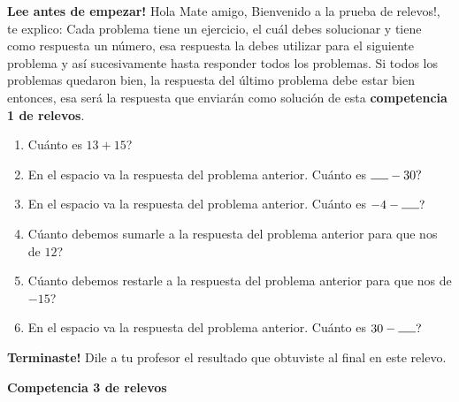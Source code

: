 \textbf{Lee antes de empezar! } Hola Mate amigo, Bienvenido a la prueba de relevos!, te explico: Cada problema tiene un ejercicio, el cuál debes solucionar y tiene como respuesta un número, esa respuesta la debes utilizar para el siguiente problema y así sucesivamente hasta responder todos los problemas. Si todos los problemas quedaron bien, la respuesta del último problema debe estar bien entonces, esa será la respuesta que enviarán como solución de esta \textbf{competencia 1 de relevos}.
\vspace{1cm}
\begin{enumerate}
	\item Cuánto es $13+15$?
	
	\item En el espacio va la respuesta del problema anterior. Cuánto es $\rule{5mm}{0.15mm} - 30?$
	
	\item En el espacio va la respuesta del problema anterior. Cuánto es $-4-\rule{5mm}{0.15mm} ?$
	
	\item Cúanto debemos sumarle a la respuesta del problema anterior para que nos de $12$?
	
	\item Cúanto debemos restarle a la respuesta del problema anterior para que nos de $-15$?
	
	\item En el espacio va la respuesta del problema anterior. Cuánto es $30-\rule{5mm}{0.15mm} ?$
\end{enumerate}

\textbf{Terminaste! } Dile a tu profesor el resultado que obtuviste al final en este relevo.
\newpage

\begin{center}
	\textbf{Competencia  3 de relevos}
\end{center}
	
